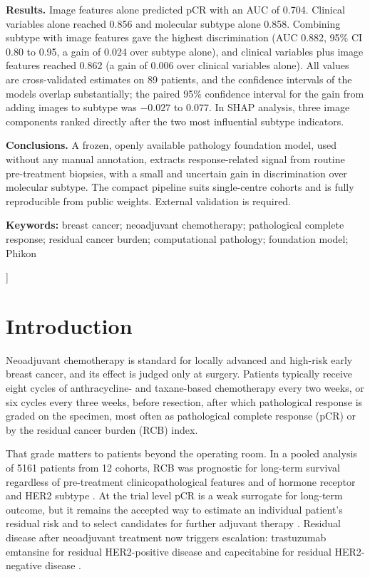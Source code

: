 \documentclass[10pt,a4paper,twocolumn]{article}
\begin{document}
{\begin{center}
\begin{minipage}{0.9\textwidth}
\textbf{Results.} Image features alone predicted pCR with an AUC of 0.704. Clinical variables alone reached 0.856 and molecular subtype alone 0.858. Combining subtype with image features gave the highest discrimination (AUC 0.882, 95\% CI 0.80 to 0.95, a gain of 0.024 over subtype alone), and clinical variables plus image features reached 0.862 (a gain of 0.006 over clinical variables alone). All values are cross-validated estimates on 89 patients, and the confidence intervals of the models overlap substantially; the paired 95\% confidence interval for the gain from adding images to subtype was $-0.027$ to $0.077$. In SHAP analysis, three image components ranked directly after the two most influential subtype indicators.

\textbf{Conclusions.} A frozen, openly available pathology foundation model, used without any manual annotation, extracts response-related signal from routine pre-treatment biopsies, with a small and uncertain gain in discrimination over molecular subtype. The compact pipeline suits single-centre cohorts and is fully reproducible from public weights. External validation is required.

\textbf{Keywords:} breast cancer; neoadjuvant chemotherapy; pathological complete response; residual cancer burden; computational pathology; foundation model; Phikon
\end{minipage}
\end{center}
\vspace{0.8em}
}]

\section{Introduction}

Neoadjuvant chemotherapy is standard for locally advanced and high-risk early breast cancer, and its effect is judged only at surgery. Patients typically receive eight cycles of anthracycline- and taxane-based chemotherapy every two weeks, or six cycles every three weeks, before resection, after which pathological response is graded on the specimen, most often as pathological complete response (pCR) or by the residual cancer burden (RCB) index.

That grade matters to patients beyond the operating room. In a pooled analysis of 5161 patients from 12 cohorts, RCB was prognostic for long-term survival regardless of pre-treatment clinicopathological features and of hormone receptor and HER2 subtype \cite{yau2022}. At the trial level pCR is a weak surrogate for long-term outcome, but it remains the accepted way to estimate an individual patient's residual risk and to select candidates for further adjuvant therapy \cite{conforti2021}. Residual disease after neoadjuvant treatment now triggers escalation: trastuzumab emtansine for residual HER2-positive disease \cite{vonminckwitz2019} and capecitabine for residual HER2-negative disease \cite{masuda2017}.
\end{document}
